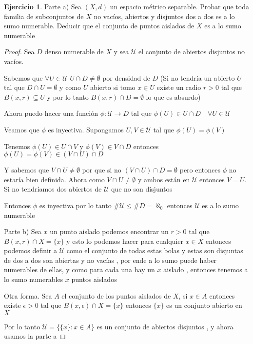 \documentclass[12pt]{article}
\newcommand{\n}{\aleph_{0}}
\newcommand{\ra}{\rightarrow}
\theoremstyle{definition}
\newtheorem{ej}{Ejercicio}
\begin{document}
\begin{ej}
Parte a)
  Sea $(X,d)$ un espacio métrico separable. Probar que toda familia de subconjuntos de $X$ no vacíos, abiertos y disjuntos dos a dos es a lo sumo numerable. Deducir que el conjunto de puntos aislados de $X$ es a lo sumo numerable
  \begin{proof}
    Sea $D$ denso numerable de $X$ y sea $\mathcal{U}$ el conjunto de abiertos disjuntos no vacíos.

    Sabemos que $\forall U \in \mathcal{U}$ $U \cap D \neq \emptyset$ por densidad de $D$ (Si no tendría un abierto $U$ tal que $D \cap U = \emptyset$ y como $U$ abierto si tomo $x \in U$ existe un radio $r>0$ tal que $B(x,r) \subseteq U$ y por lo tanto $B(x,r) \cap D = \emptyset$ lo que es absurdo)

    Ahora puedo hacer una función $\phi: \mathcal{U} \ra D$ tal que $\phi(U) \in U \cap D \quad \forall U \in \mathcal{U}$

    Veamos que $\phi$ es inyectiva. Supongamos $U,V \in \mathcal{U}$ tal que $\phi(U) = \phi(V)$ 

  Tenemos $\phi(U) \in U \cap V$ y $\phi (V) \in V \cap D$ entonces $\phi(U) = \phi(V) \in (V \cap U ) \cap D$

	  Y sabemos que $V \cap U \neq \emptyset$ por que si no $(V \cap U ) \cap D = \emptyset$ pero entonces $\phi$ no estaría bien definida. Ahora como $V \cap U \neq \emptyset$ y ambos están en $\mathcal{U}$ entonces $V = U$. Si no tendríamos dos abiertos de $\mathcal{U}$ que no son disjuntos

  Entonces $\phi$ es inyectiva por lo tanto $\# \mathcal{U} \leq \# D = \n$ entonces $\mathcal{U}$ es a lo sumo numerable

Parte b) Sea $x$ un punto aislado podemos encontrar un $r >0$ tal que $B(x,r) \cap X = \{x\}$ y esto lo podemos hacer para cualquier $x \in X$ entonces podemos definir a $\mathcal{U}$ como el conjunto de todas estas bolas y estas son disjuntas de dos a dos son abiertas y no vacías , por ende a lo sumo puede haber numerables de ellas, y como para cada una hay un $x $ aislado , entonces tenemos a lo sumo numerables $x$ puntos aislados

Otra forma. Sea $A$ el conjunto de los puntos aislados de $X$, si $x \in A$ entonces existe $\epsilon > 0$ tal que $B(x,\epsilon) \cap X = \{x\}$ entonces $\{x\}$ es un conjunto abierto en $X$ 

Por lo tanto $\mathcal{U} = \{\{x\}: x \in A\}$ es un conjunto de abiertos disjuntos , y ahora usamos la parte a
  \end{proof}
\end{ej}
\end{document}
